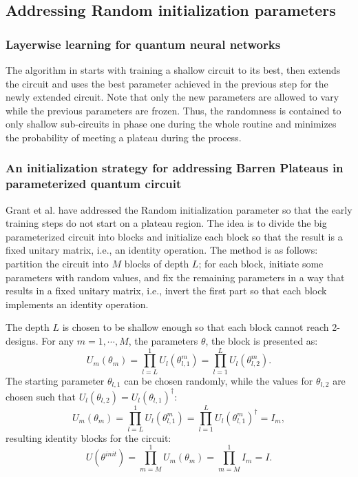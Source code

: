 \subsection{Addressing Random initialization parameters}

\subsubsection{Layerwise learning for quantum neural networks \texorpdfstring{\cite{skolikLayerwiseLearningQuantum2021}}{}}
The algorithm in \cite{skolikLayerwiseLearningQuantum2021} starts with training a shallow circuit to its best, then extends the circuit and uses the best parameter achieved in the previous step for the newly extended circuit. 
Note that only the new parameters are allowed to vary while the previous parameters are frozen.
Thus, the randomness is contained to only shallow sub-circuits in phase one during the whole routine and minimizes the probability of meeting a plateau during the process.


\subsubsection{An initialization strategy for addressing Barren Plateaus in parameterized quantum circuit \texorpdfstring{\cite{grantInitializationStrategyAddressing2019}}{}  }

Grant et al. have addressed the Random initialization parameter so that the early training steps do not start on a plateau region. 
The idea is to divide the big parameterized circuit into blocks and initialize each block so that the result is a fixed unitary matrix, i.e., an identity operation. 
The method is as follows: partition the circuit into $M$ blocks of depth $L$; for each block, initiate some parameters with random values, and fix the remaining parameters in a way that results in a fixed unitary matrix, i.e., invert the first part so that each block implements an identity operation.

The depth $L$ is chosen to be shallow enough so that each block cannot reach 2-designs. For any $m = 1, \cdots, M$, the parameters $\theta$, the block is presented as:
\begin{equation}
    U_m(\theta_m)
    = \prod_{l=L}^1 U_l(\theta_{l,1}^m)
    = \prod_{l=1}^L U_l(\theta_{l,2}^m).
\end{equation}
The starting parameter $\theta_{l,1}$ can be chosen randomly, while the values for $\theta_{l,2}$ are chosen such that $U_l(\theta_{l,2}) = U_l(\theta_{l,1})^\dagger$:
\begin{equation}
    U_m(\theta_m)
    = \prod_{l=L}^1 U_l(\theta_{l,1}^m)
    = \prod_{l=1}^L U_l(\theta_{l,1}^m)^\dagger
    = I_m,
\end{equation}
resulting identity blocks for the circuit:
\begin{equation}
    U(\theta^{init})
    = \prod_{m=M}^1 U_m(\theta_m)
    = \prod_{m=M}^1 I_m
    = I.
\end{equation}